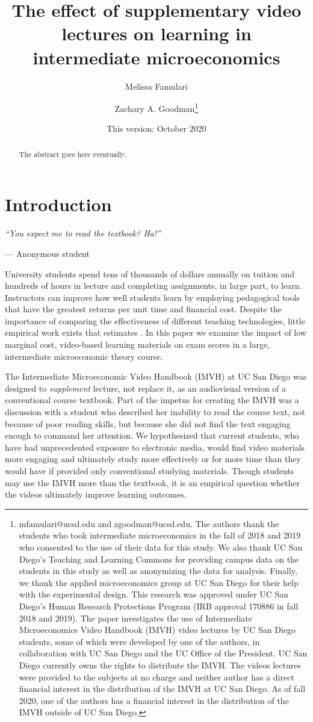 \documentclass[12pt]{article}
\title{The effect of supplementary video lectures on learning in intermediate microeconomics}
\author{Melissa Famulari}
\author{Zachary A. Goodman\thanks{mfamulari@ucsd.edu and zgoodman@ucsd.edu. The authors thank the students who took intermediate microeconomics in the fall of 2018 and 2019 who consented to the use of their data for this study. We also thank UC San Diego's Teaching and Learning Commons for providing campus data on the students in this study as well as anonymizing the data for analysis. Finally, we thank the applied microeconomics group at UC San Diego for their help with the experimental design. This research was approved under UC San Diego's Human Research Protections Program (IRB approval 170886 in fall 2018 and 2019). The paper investigates the use of Intermediate Microeconomics Video Handbook (IMVH) video lectures by UC San Diego students, some of which were developed by one of the authors, in collaboration with UC San Diego and the UC Office of the President. UC San Diego currently owns the rights to distribute the IMVH. The videos lectures were provided to the subjects at no charge and neither author has a direct financial interest in the distribution of the IMVH at UC San Diego. As of fall 2020, one of the authors has a financial interest in the distribution of the IMVH outside of UC San Diego.}}
\affil{University of California, San Diego}
\date{This version: October 2020} %
\begin{document}
\maketitle
\begin{abstract}
	The abstract goes here eventually.
\end{abstract}

\newpage


\section{Introduction}

\epigraph{\textit{``You expect me to read the textbook? Ha!''}}{--- Anonymous student}\bigskip

University students spend tens of thousands of dollars annually on tuition and hundreds of hours in lecture and completing assignments, in large part, to learn. Instructors can improve how well students learn by employing pedagogical tools that have the greatest returns per unit time and financial cost. Despite the importance of comparing the effectiveness of different teaching technologies, little empirical work exists that estimates . In this paper we examine the impact of low marginal cost, video-based learning materials on exam scores in a large, intermediate microeconomic theory course. %

The Intermediate Microeconomic Video Handbook (IMVH) at UC San Diego was designed to \textit{supplement} lecture, not replace it, as an audiovisual version of a conventional course textbook. Part of the impetus for creating the IMVH was a discussion with a student who described her inability to read the course text, not because of poor reading skills, but because she did not find the text engaging enough to command her attention. We hypothesized that current students, who have had unprecedented exposure to electronic media, would find video materials more engaging and ultimately study more effectively or for more time than they would have if provided only conventional studying materials. Though students may use the IMVH more than the textbook, it is an empirical question whether the videos ultimately improve learning outcomes.
\end{document}
